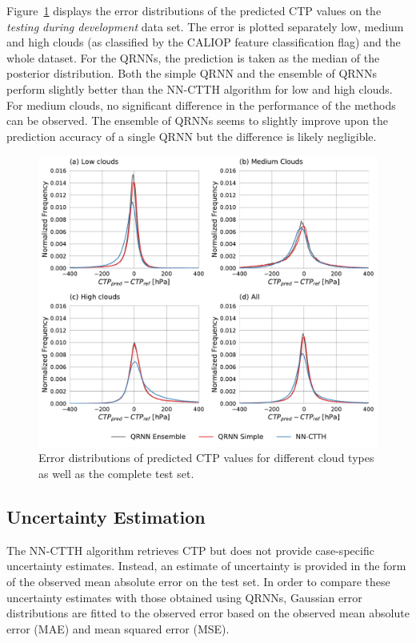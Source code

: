 \documentclass[journal abbreviation, manuscript]{copernicus}
\begin{document}
Figure~\ref{fig:ctp_results} displays the error distributions of the predicted
CTP values on the \textit{testing during development} data set. The error is
plotted separately low, medium and high clouds (as classified by the CALIOP
feature classification flag) and the whole dataset. For the QRNNs, the
prediction is taken as the median of the posterior distribution. Both the simple
QRNN and the ensemble of QRNNs perform slightly better than the NN-CTTH
algorithm for low and high clouds. For medium clouds, no significant difference
in the performance of the methods can be observed. The ensemble of QRNNs seems
to slightly improve upon the prediction accuracy of a single QRNN but the
difference is likely negligible.

\begin{figure}[hbpt!]
  \centering
  \includegraphics[width = 1.0\linewidth]{../plots/ctp_results}
  \caption{Error distributions of predicted CTP values for different cloud
    types as well as the complete test set.}
  \label{fig:ctp_results}
\end{figure}

\subsection{Uncertainty Estimation}

The NN-CTTH algorithm retrieves CTP but does not provide case-specific
uncertainty estimates. Instead, an estimate of uncertainty is provided in the
form of the observed mean absolute error on the test set. In order to compare
these uncertainty estimates with those obtained using QRNNs, Gaussian error
distributions are fitted to the observed error based on the observed mean
absolute error (MAE) and mean squared error (MSE).
\end{document}
